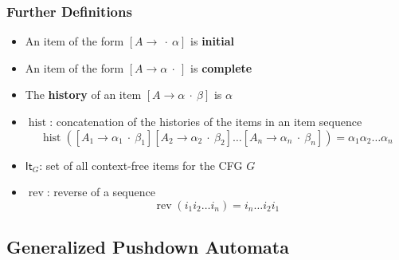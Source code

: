 \documentclass{beamer}
\newcommand{\concept}[1]{\textbf{#1}}
\newcommand{\It}[1]{\ensuremath{\mathsf{It}_{#1}}}
\newcommand{\cfitem}[3]{\ensuremath{{[#1 \to #2 \:\cdot\: #3]}}}
\DeclareMathOperator{\hist}{hist}
\DeclareMathOperator{\rev}{rev}
\begin{document}
\begin{frame}
  \frametitle{Further Definitions}
  \begin{itemize}
    \item An item of the form \cfitem{A}{}{\alpha} is \concept{initial}
    \item An item of the form \cfitem{A}{\alpha}{} is \concept{complete}
    \item The \concept{history} of an item \cfitem{A}{\alpha}{\beta} is $\alpha$
    \item $\hist$: concatenation of the
    histories of the items in an item sequence
    \small
    \[ \hist (\cfitem{A_1}{\alpha_1}{\beta_1}\cfitem{A_2}{\alpha_2}{\beta_2}\ldots\cfitem{A_n}{\alpha_n}{\beta_n})
        =  \alpha_1 \alpha_2 \ldots \alpha_n \]
    \normalsize
    \item \It{G}: set of all context-free items for the CFG $G$
    \pause
    \bigskip
    \item $\rev$: reverse of a sequence
    \[ \rev (i_1 i_2 \ldots i_n) = i_n \ldots i_2 i_1 \]
  \end{itemize}
\end{frame}

\subsection{Generalized Pushdown Automata}
\end{document}
